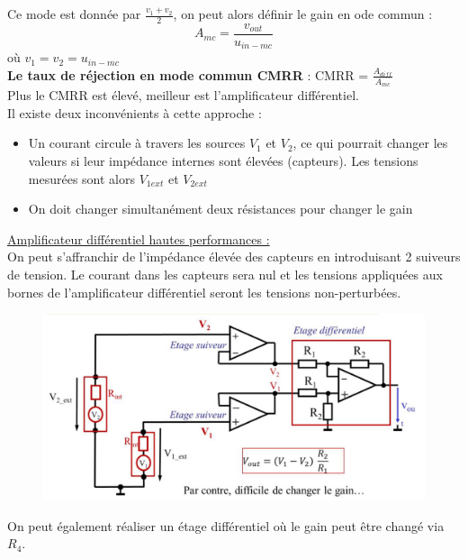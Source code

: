 \documentclass[../main.tex]{subfiles}
\begin{document}
Ce mode est donnée par $\frac{v_1+v_2}{2}$, on peut alors définir le gain en ode commun : \begin{equation}
    A_{mc} = \frac{v_{out}}{u_{in-mc}}
\end{equation}
où $v_1=v_2= u_{in-mc}$\\

\textbf{Le taux de réjection en mode commun CMRR} : CMRR = $\frac{A_{diff}}{A_{mc}}$\\

\warning Plus le CMRR est élevé, meilleur est l'amplificateur différentiel.\\

Il existe deux inconvénients à cette approche : \begin{itemize}
    \item Un courant circule à travers les sources $V_1$ et $V_2$, ce qui pourrait changer les valeurs si leur impédance internes sont élevées (capteurs). Les tensions mesurées sont alors $V_{1ext}$ et $V_{2ext}$\\
    \item On doit changer simultanément deux résistances pour changer le gain\\
\end{itemize}

\quad \underline{Amplificateur différentiel hautes performances :}\\

On peut s'affranchir de l'impédance élevée des capteurs en introduisant 2 suiveurs de tension. Le courant dans les capteurs sera nul et les tensions appliquées aux bornes de l'amplificateur différentiel seront les tensions non-perturbées.\\

\begin{figure}[hbt!]
    \centering
    \includegraphics[width=.6\textwidth]{IMAGES/elec/IMG_0141.jpeg}
\end{figure}

On peut également réaliser un étage différentiel où le gain peut être changé via $R_4$.\\
\end{document}
